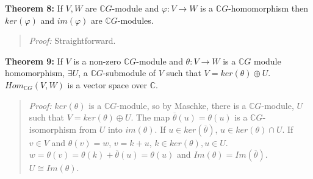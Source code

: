 {\bf Theorem 8:} If $V, W$ are ${\mathbb C}G$-module and
$\varphi: V \rightarrow W$ is a ${\mathbb C}G$-homomorphism
then $ker(\varphi)$ and $im(\varphi)$ are 
${\mathbb C}G$-modules. 
\begin{quote}
\emph{Proof:}  
Straightforward.
\end{quote}
{\bf Theorem 9:} If $V$ is a non-zero ${\mathbb C}G$-module 
and $\theta: V \rightarrow W$ is a ${\mathbb C}G$ module
homomorphism, $\exists U$, 
a ${\mathbb C}G$-submodule of $V$ such that $V= ker(\theta) \oplus U$.
$Hom_{{\mathbb C}G}(V,W)$ is a vector space over ${\mathbb C}$.  
\begin{quote}
\emph{Proof:}  
$ker(\theta)$ is a ${\mathbb C}G$-module, so by 
Maschke, there is a ${\mathbb C}G$-module, $U$ such that $V= ker(\theta) \oplus U$.
The map ${\overline  \theta}(u) = \theta(u)$ is a ${\mathbb C}G$-isomorphism from $U$ into $im(\theta)$.
If $u \in ker({\overline \theta})$, $u \in ker(\theta) \cap U$.  If $v \in V$ and $\theta(v)= w$, $v = k + u$,
$k \in ker(\theta), u \in U$.  $w= \theta(v)= \theta(k) + {\overline \theta}(u) = \theta(u)$ and $Im(\theta)= Im({\overline \theta})$.
$U \cong Im(\theta)$.
\end{quote}
